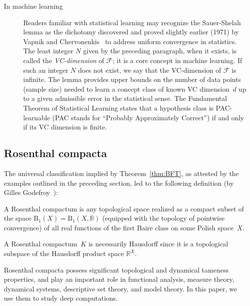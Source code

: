 \begin{description}
\item[In machine learning]
Readers familiar with statistical learning may recognize the Sauer-Shelah lemma as the dichotomy discovered and proved slightly earlier (1971) by Vapnik and Chervonenkis~\cite{Vapnik-Chervonenkis:1971, Vapnik-Chervonenkis:1974} to address uniform convergence in statistics.
The least integer $N$ given by the preceding paragraph, when it exists, is called the \emph{VC-dimension} of $\mathscr{F}$;
it is a core concept in machine learning.
If such an integer $N$ does not exist, we say that the VC-dimension of $\mathscr{F}$ is infinite.
The lemma provides upper bounds on the number of data points (sample size) needed to learn a concept class of known VC dimension~$d$ up to a given admissible error in the statistical sense.
The Fundamental Theorem of Statistical Learning states that a hypothesis class is PAC-learnable (PAC stands for ``Probably Approximately Correct'') if and only if its VC dimension is finite.
 
\end{description}
 
\subsection{Rosenthal compacta}
 
The universal classification implied by Theorem~\ref{thm:BFT}, as attested by the examples outlined in the preceding section, led to the following definition (by Gilles Godefroy~\cite{Godefroy:1980}):

\begin{definition}
\label{def:Rosenthal-compacta}
A Rosenthal compactum is any topological space realized as a compact subset of the space $\mathrm{B}_1(X) = \mathrm{B}_1(X, \mathbb{R})$ (equipped with the topology of pointwise convergence) of all real functions of the first Baire class on some Polish space~\(X\).
\end{definition}
A Rosenthal compactum~$K$ is necessarily Hausdorff since it is a topological subspace of the Hausdorff product space $\mathbb{R}^X$.

Rosenthal compacta possess significant topological and dynamical tameness properties, and play an important role in functional analysis, measure theory, dynamical systems, descriptive set theory, and model theory.
In this paper, we use them to study deep computations.

